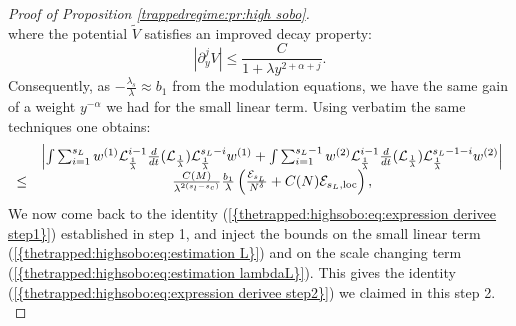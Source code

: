 \documentclass[11pt,a4paper,reqno]{amsart}
\theoremstyle{remark}
\numberwithin{equation}{section}
\begin{document}
\begin{proof}[Proof of Proposition \ref{trappedregime:pr:high sobo}]
$$$$
where the potential $\tilde{V}$ satisfies an improved decay property:
$$
\left|\partial_y^jV \right| \leq \frac{C}{1+\lambda y^{2+\alpha+j}}.
$$
Consequently, as $-\frac{\lambda_s}{\lambda}\approx b_1$ from the modulation equations, we have the same gain of a weight $y^{-\alpha}$ we had for the small linear term. Using verbatim the same techniques one obtains:
\begin{equation} \label{thetrapped:highsobo:eq:estimation lambdaL}
\begin{array}{r c l}
& \left| \int \sum_{i=1}^{s_L} w^{(1)} \mathcal{L}_{\frac{1}{\lambda}}^{i-1}\frac{d}{dt}(\mathcal{L}_{\frac{1}{\lambda}})\mathcal{L}_{\frac{1}{\lambda}}^{s_L-i}w^{(1)}+\int \sum_{i=1}^{s_L-1} w^{(2)} \mathcal{L}_{\frac{1}{\lambda}}^{i-1}\frac{d}{dt}(\mathcal{L}_{\frac{1}{\lambda}})\mathcal{L}_{\frac{1}{\lambda}}^{s_L-1-i}w^{(2)}\right| \\
\leq &\frac{C(M)}{\lambda^{2(s_l-s_c)}}\frac{b_1}{\lambda} \left(\frac{\mathcal{E}_{s_L}}{N^{\delta}} +C(N) \mathcal{E}_{s_L,\text{loc}} \right) ,
\end{array}
\end{equation}
We now come back to the identity {{\rm (\ref{{thetrapped:highsobo:eq:expression derivee step1}})}} established in step 1, and inject the bounds on the small linear term {{\rm (\ref{{thetrapped:highsobo:eq:estimation L}})}} and on the scale changing term {{\rm (\ref{{thetrapped:highsobo:eq:estimation lambdaL}})}}. This gives the identity {{\rm (\ref{{thetrapped:highsobo:eq:expression derivee step2}})}}  we claimed in this step 2.\\


\end{proof}
\end{document}
